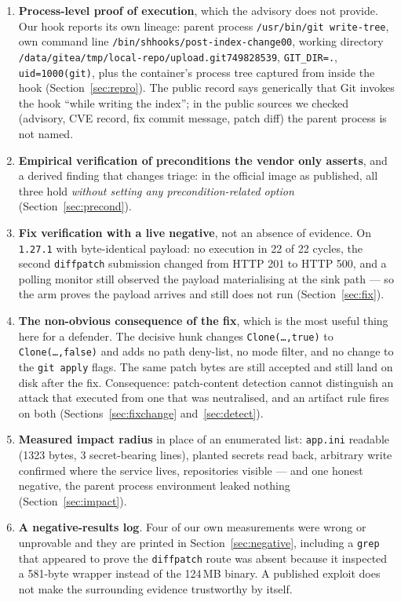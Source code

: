 \documentclass[journal]{IEEEtran}
\begin{document}
\begin{enumerate}
\item \textbf{Process-level proof of execution}, which the advisory does not
provide. Our hook reports its own lineage: parent process
\texttt{/usr/bin/git write-tree}, own command line
\texttt{/bin/sh\hspace{0pt}hooks/post-index-change\hspace{0pt}0\hspace{0pt}0}, working
directory
\texttt{/data/gitea/tmp/\allowbreak local-repo/\allowbreak upload.git749828539},
\texttt{GIT\_DIR=.}, \texttt{uid=1000(git)}, plus the container's process tree
captured from inside the hook (Section~\ref{sec:repro}). The public record says
generically that Git invokes the hook ``while writing the index''; in the public
sources we checked (advisory, CVE record, fix commit message, patch diff) the
parent process is not named.
\item \textbf{Empirical verification of preconditions the vendor only asserts},
and a derived finding that changes triage: in the official image as published,
all three hold \emph{without setting any precondition-related option}
(Section~\ref{sec:precond}).
\item \textbf{Fix verification with a live negative}, not an absence of
evidence. On \texttt{1.27.1} with byte-identical payload: no execution in 22 of
22 cycles, the second \texttt{diffpatch} submission changed from HTTP 201 to
HTTP 500, and a polling monitor still observed the payload materialising at the
sink path --- so the arm proves the payload arrives and still does not run
(Section~\ref{sec:fix}).
\item \textbf{The non-obvious consequence of the fix}, which is the most useful
thing here for a defender. The decisive hunk changes
\texttt{Clone(\dots,\allowbreak true)} to \texttt{Clone(\dots,\allowbreak false)}
and adds no path deny-list, no mode filter, and no change to the
\texttt{git apply} flags. The same patch bytes are still accepted and still land
on disk after the fix. Consequence: patch-content detection cannot distinguish
an attack that executed from one that was neutralised, and an artifact rule
fires on both (Sections~\ref{sec:fixchange} and~\ref{sec:detect}).
\item \textbf{Measured impact radius} in place of an enumerated list:
\texttt{app.ini} readable (1323 bytes, 3 secret-bearing lines), planted secrets
read back, arbitrary write confirmed where the service lives, repositories
visible --- and one honest negative, the parent process environment leaked
nothing (Section~\ref{sec:impact}).
\item \textbf{A negative-results log}. Four of our own measurements were wrong
or unprovable and they are printed in Section~\ref{sec:negative}, including a
\texttt{grep} that appeared to prove the \texttt{diffpatch} route was absent
because it inspected a 581-byte wrapper instead of the 124\,MB binary. A
published exploit does not make the surrounding evidence trustworthy by
itself.
\end{enumerate}
\end{document}
